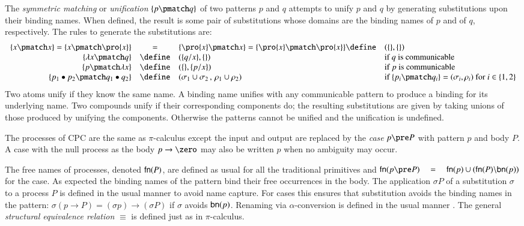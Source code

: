 \documentclass{llncs}
\begin{document}
The {\em symmetric matching} or {\em unification} $\{p \pmatch q\}$ of
two patterns $p$ and $q$ attempts to unify $p$ and $q$ by generating
substitutions upon their binding names. When defined, the result is
some pair of substitutions whose domains are the binding names of $p$
and of $q$, respectively.
The rules to generate the substitutions are:
\begin{eqnarray*}
\begin{array}{rcll}
\{x\pmatch x\} =
\{x\pmatch \pro{x}\} &=&
\{\pro{x}\pmatch x\} =
\{\pro{x}\pmatch \pro{x}\} \define & (\{\}, \{\})\\
\{\lambda x\pmatch q\} &\define&  (\{q/x\}, \{\}) & \mbox{if $q$ is communicable}\\
\{p\pmatch \lambda x\} &\define&  (\{\}, \{p/x\}) & \mbox{if $p$ is communicable}\\
\{p_1\bullet p_2\pmatch q_1\bullet q_2\} &\define&  (\sigma_1\cup\sigma_2\,,\, \rho_1\cup\rho_2)
			& \mbox{if } \{p_i\pmatch q_i\}= (\sigma_i, \rho_i) \mbox{ for } i \in \{1,2\}\\
\end{array}
\end{eqnarray*}
Two atoms unify if they know the same name. A binding name unifies with any communicable pattern to
produce a binding for its underlying name.  Two compounds unify if
their corresponding components do; the resulting substitutions are
given by taking unions of those produced by unifying the components.
Otherwise the patterns cannot be unified and the unification is undefined.


The processes of CPC are the same as $\pi$-calculus except the
input and output are replaced by the {\em case} $p\pre P$ with pattern $p$ and body $P$.
A case with the null process as the body $p\to \zero$ may also be written $p$ when no
ambiguity may occur.

The free names of processes, denoted ${\sf fn}(P)$, are defined as
usual for all the traditional primitives and
${\sf fn}(p\pre P) \quad =\quad {\sf fn}(p)\cup({\sf fn}(P)\backslash{\sf bn}(p))$
for the case. As expected the binding names of the pattern bind their free occurrences in the body.
The application $\sigma P$ of a substitution $\sigma$ to a process $P$ is defined in the usual
manner to avoid name capture. For cases this ensures that substitution avoids the binding names in the pattern:
$\sigma(p\to P) = (\sigma p)\to (\sigma P)$ if $\sigma$ avoids ${\sf bn}(p)$.
Renaming via $\alpha$-conversion is defined in the usual manner
\cite{GivenWilsonGorlaJay10,GivenWilsonPHD,givenwilson:hal-00987578}.
The general {\em structural equivalence relation} $\equiv$ is defined
just as in $\pi$-calculus.
\end{document}
